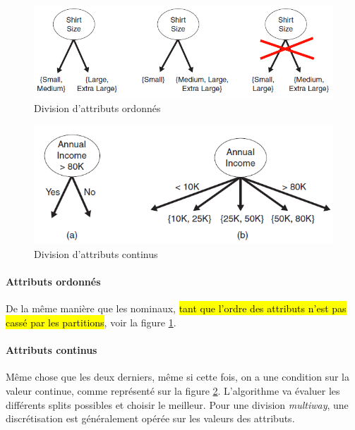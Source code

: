 \documentclass[letterpaper, 12pt]{article}
\begin{document}
				\begin{minipage}{0.45\textwidth}
					\begin{figure}[H]
						\centering
						\includegraphics[scale=0.6]{Images/tree_ordinal.png}
						\caption{Division d'attributs ordonnés}
						\label{fig:tree:ordinal}
					\end{figure}\noindent
					\begin{figure}[H]
						\centering
						\includegraphics[scale=0.6]{Images/tree_continuous.png}
						\caption{Division d'attributs continus}
						\label{fig:tree:continuous}
					\end{figure}\noindent
				\end{minipage}
			\paragraph{Attributs ordonnés} De la même manière que les 
				nominaux, \hl{tant que l'ordre des attributs n'est pas
				cassé par les partitions}, voir la figure
				\ref{fig:tree:ordinal}.
			\paragraph{Attributs continus} Même chose que les deux derniers,
				même si cette fois, on a une condition sur la valeur
				continue, comme représenté sur la figure
				\ref{fig:tree:continuous}. L'algorithme va
				évaluer les différents splits possibles et choisir le
				meilleur. Pour une division \textit{multiway}, 
				une discrétisation est généralement opérée sur les valeurs
				des attributs.
		\newpage
\end{document}
